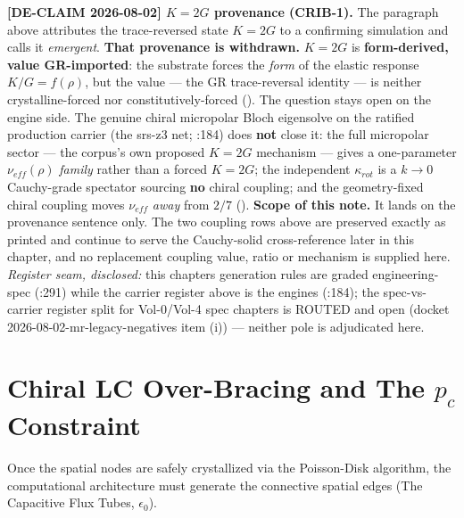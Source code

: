 \noindent\textbf{[DE-CLAIM 2026-08-02] $K = 2G$ provenance (CRIB-1).} The paragraph above attributes the trace-reversed state $K = 2G$ to a confirming simulation and calls it \emph{emergent}. \textbf{That provenance is withdrawn.} $K = 2G$ is \textbf{form-derived, value GR-imported}: the substrate forces the \emph{form} of the elastic response $K/G = f(\rho)$, but the value --- the GR trace-reversal identity --- is neither crystalline-forced nor constitutively-forced (). The question stays open on the engine side. The genuine chiral micropolar Bloch eigensolve on the ratified production carrier (the srs-z3 net; :184) does \textbf{not} close it: the full micropolar sector --- the corpus's own proposed $K = 2G$ mechanism --- gives a one-parameter $\nu_{eff}(\rho)$ \emph{family} rather than a forced $K = 2G$; the independent $\kappa_{rot}$ is a $k \to 0$ Cauchy-grade spectator sourcing \textbf{no} chiral coupling; and the geometry-fixed chiral coupling moves $\nu_{eff}$ \emph{away} from $2/7$ (). \textbf{Scope of this note.} It lands on the provenance sentence only. The two coupling rows above are preserved exactly as printed and continue to serve the Cauchy-solid cross-reference later in this chapter, and no replacement coupling value, ratio or mechanism is supplied here. \emph{Register seam, disclosed:} this chapter\textquotesingle s generation rules are graded engineering-spec (:291) while the carrier register above is the engine\textquotesingle s (:184); the spec-vs-carrier register split for Vol-0/Vol-4 spec chapters is ROUTED and open (docket 2026-08-02-mr-legacy-negatives item (i)) --- neither pole is adjudicated here.

\section{Chiral LC Over-Bracing and The $p_c$ Constraint}
Once the spatial nodes are safely crystallized via the Poisson-Disk algorithm, the computational architecture must generate the connective spatial edges (The Capacitive Flux Tubes, $\epsilon_0$).

